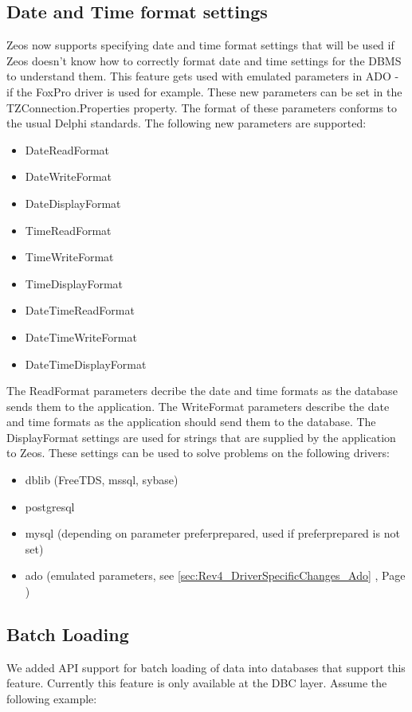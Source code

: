 \documentclass[a4paper,12pt,oneside]{book}
\begin{document}
\subsection{Date and Time format settings}
\label{sec:Rev4_GeneralChanges_DateAndTimeFormatSettings}
Zeos now supports specifying date and time format settings that will be used if Zeos doesn't know how to correctly format date and time settings for the DBMS to understand them.
This feature gets used with emulated parameters in ADO - if the FoxPro driver is used for example.
These new parameters can be set in the TZConnection.Properties property.
The format of these parameters conforms to the usual Delphi standards.
The following new parameters are supported:
\begin{itemize}
\item DateReadFormat
\item DateWriteFormat
\item DateDisplayFormat
\item TimeReadFormat
\item TimeWriteFormat
\item TimeDisplayFormat
\item DateTimeReadFormat
\item DateTimeWriteFormat
\item DateTimeDisplayFormat
\end{itemize}
The ReadFormat parameters decribe the date and time formats as the data\-base sends them to the application.
The WriteFormat parameters describe the date and time formats as the application should send them to the database.
The DisplayFormat settings are used for strings that are supplied by the application to Zeos.
These settings can be used to solve problems on the following drivers:
\begin{itemize}
\item dblib (FreeTDS, mssql, sybase)
\item postgresql
\item mysql (depending on parameter preferprepared, used if preferprepared is not set)
\item ado (emulated parameters, see \ref{sec:Rev4_DriverSpecificChanges_Ado} , Page \pageref{sec:Rev4_DriverSpecificChanges_Ado})
\end{itemize}

\subsection{Batch Loading}
\label{sec:Rev4_GeneralChanges_BatchLoading}
We added API support for batch loading of data into databases that support this feature.
Currently this feature is only available at the DBC layer.
Assume the following example:
\end{document}
